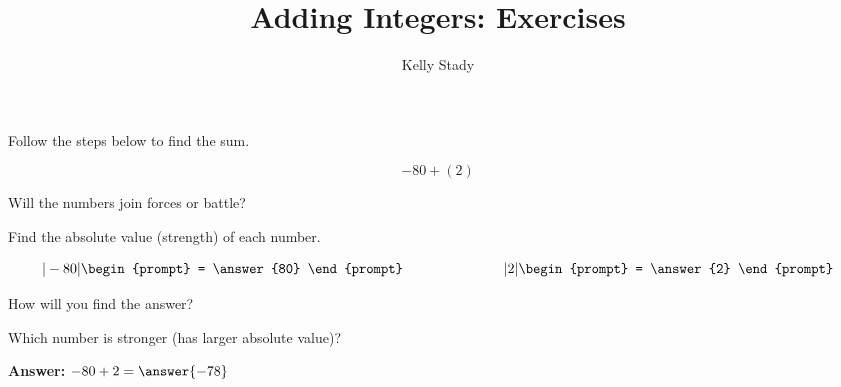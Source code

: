 \documentclass{ximera}[font=12pt]
\title{Adding Integers: Exercises}   %
\author{Kelly Stady}
\begin{document}
  


\begin{abstract}

\end{abstract}

\maketitle
\label{xim:AddIntExercises}

\begin{problem}
Follow the steps below to find the sum.

\[ -80 + (2) \]

Will the numbers join forces or battle?

\begin{multipleChoice}
\end{multipleChoice}

\begin{problem}
Find the absolute value (strength) of each number.

\[ |-80| \begin{prompt} = \answer{80} \end{prompt} \hspace{1in} |2| \begin{prompt} = \answer{2} \end{prompt} \]

\begin{problem}
How will you find the answer?

\begin{multipleChoice}
\end{multipleChoice}

\begin{problem}
Which number is stronger (has larger absolute value)?

\begin{multipleChoice}
\end{multipleChoice}

\textbf{Answer:}  $-80 + 2 = \answer{-78}$

\end{problem}
\end{problem}
\end{problem}
\end{problem}
\end{document}
